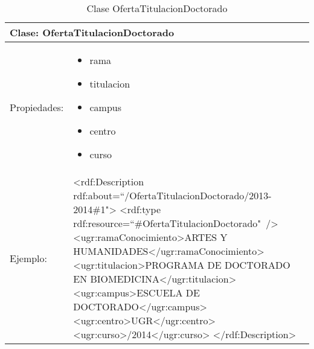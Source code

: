 \begin{table}[!ht]
	\centering
	\begin{tabular}{|p{}|p{}|}
		\hline
		\multicolumn{2}{|l|}{Clase: \textbf{OfertaTitulacionDoctorado}}
		\\ \hline
		Propiedades:&
		\begin{itemize}
			\item rama
			\item titulacion
			\item campus
			\item centro
			\item curso
		\end{itemize}
		\\ \hline
		Ejemplo:&
		\textless rdf:Description \newline\tab rdf:about=``/OfertaTitulacionDoctorado/2013-2014\#1"\textgreater \newline
		\tab \textless rdf:type rdf:resource=``\#OfertaTitulacionDoctorado"\ /\textgreater 
		\newline \tab \textless ugr:ramaConocimiento\textgreater \newline\tab\tab ARTES Y HUMANIDADES\newline\tab\textless /ugr:ramaConocimiento\textgreater 
		\newline\tab \textless ugr:titulacion\textgreater \newline\tab\tab PROGRAMA DE DOCTORADO EN BIOMEDICINA\newline\tab \textless/ugr:titulacion\textgreater 
		\newline\tab \textless ugr:campus\textgreater \newline\tab\tab ESCUELA DE DOCTORADO\newline\tab\textless /ugr:campus\textgreater 
		\newline\tab \textless ugr:centro\textgreater \newline\tab\tab UGR\newline\tab\textless /ugr:centro\textgreater 
		\newline\tab \textless ugr:curso\textgreater \newline\tab\tab 2013/2014\newline\tab\textless /ugr:curso\textgreater 
		\newline\textless /rdf:Description\textgreater 
		\\ \hline
	\end{tabular}
	\caption{Clase OfertaTitulacionDoctorado}
	\label{clase-ofertatitulaciondoctorado}
\end{table}

